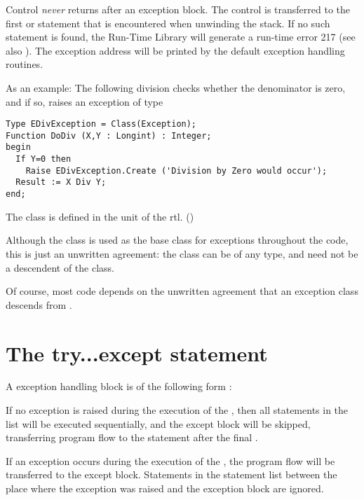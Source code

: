 \begin{remark} Control {\em never} returns after an exception block. The
control is transferred to the first  or
 statement that is encountered when unwinding the stack.
If no such statement is found, the \fpc Run-Time Library will generate a
run-time error 217 (see also ). The exception address
will be printed by the default exception handling routines.
\end{remark}

As an example: The following division checks whether the denominator is
zero, and if so, raises an exception of type 
\begin{verbatim}
Type EDivException = Class(Exception);
Function DoDiv (X,Y : Longint) : Integer;
begin
  If Y=0 then
    Raise EDivException.Create ('Division by Zero would occur');
  Result := X Div Y;
end;
\end{verbatim}
The class  is defined in the  unit of the rtl.
()

\begin{remark}
Although the  class is used as the base class for exceptions
throughout the code, this is just an unwritten agreement: the class can
be of any type, and need not be a descendent of the  class.

Of course, most code depends on the unwritten agreement that an exception
class descends from .
\end{remark}

\section{The try...except statement}
A  exception handling block is of the following form :

If no exception is raised during the execution of the ,
then all statements in the list will be executed sequentially, and the
except block will be skipped, transferring program flow to the statement
after the final .

If an exception occurs during the execution of the , the
program flow will be transferred to the except block. Statements in the
statement list between the place where the exception was raised and the
exception block are ignored.

